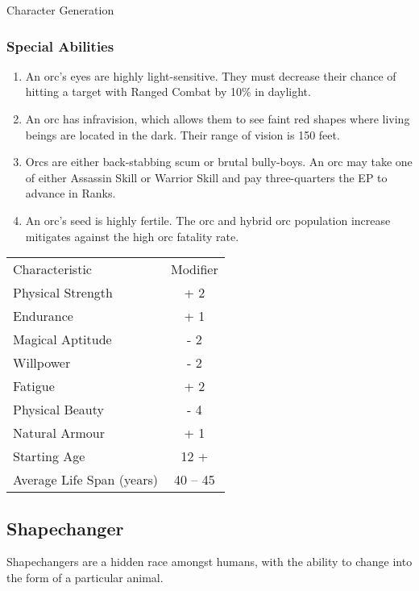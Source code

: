 \begin{Chapter}{Character Generation}
\subsubsection{Special Abilities}

\begin{enumerate}
  
\item An orc’s eyes are highly light-sensitive.  They must decrease
  their chance of hitting a target with Ranged Combat by 10\% in
  daylight.

\item An orc has infravision, which allows them to see faint red
  shapes where living beings are located in the dark. Their range of
  vision is 150 feet.

\item Orcs are either back-stabbing scum or brutal bully-boys.  An orc
  may take one of either Assassin Skill or Warrior Skill and pay
  three-quarters the EP to advance in Ranks.

\item An orc’s seed is highly fertile.  The orc and hybrid orc
  population increase mitigates against the high orc fatality rate.

\end{enumerate}
  
\begin{tabularx}{\columnwidth}{Xc}
Characteristic 			& Modifier \\
Physical Strength		& + 2 \\
Endurance			& + 1 \\
Magical Aptitude		& - 2 \\
Willpower			& - 2 \\
Fatigue				& + 2 \\
Physical Beauty			& - 4 \\
Natural Armour			& + 1 \\
Starting Age			&  12 + \\
Average Life Span (years)	& 40 -- 45 \\
\end{tabularx}

\subsection{Shapechanger}


Shapechangers are a hidden race amongst humans, with the ability to
change into the form of a particular animal.


\end{Chapter}
